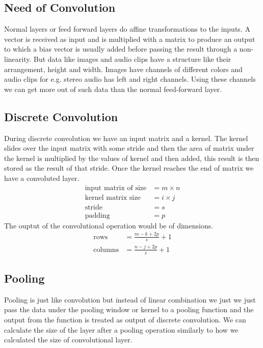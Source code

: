 \documentclass[../main.tex]{subfiles}
\begin{document}
\subsection{Need of Convolution}
Normal layers or feed forward layers do affine transformations to the inputs. A vector is received as input and is multiplied with a matrix to produce an output to which a bias vector is usually added before passing the result through a non-linearity.
But data like images and audio clips have a structure like their arrangement, height and width. Images have channels of different colors and audio clips for e.g. stereo audio has left and right channels. Using these channels we can get more out of such data than the normal feed-forward layer.
\subsection{Discrete Convolution}
During discrete convolution we have an input matrix and a kernel. The kernel slides over the input matrix with some stride and then the area of matrix under the kernel is multiplied by the values of kernel and then added, this result is then stored as the result of that stride.
Once the kernel reaches the end of matrix we have a convoluted layer.
\begin{align*}
  \text{input matrix of size} &= m \times n \\
  \text{kernel matrix size} &= i \times j \\
  \text{stride} &= s \\
  \text{padding} &= p
\end{align*}
  The ouptut of the convolutional operation would be of dimensions.
\begin{align*}
  \text{rows} &= \frac{m-k+2p}{s} + 1 \\
  \text{columns} &= \frac{n-j+2p}{s} + 1
\end{align*}
\subsection{Pooling}
Pooling is just like convolution but instead of linear combination we just we just pass the data under the pooling window or kernel to a pooling function and the output from the function is treated as output of discrete convolution. We can calculate the size of the layer after a pooling operation similarly to how we calculated the size of convolutional layer.
\end{document}

